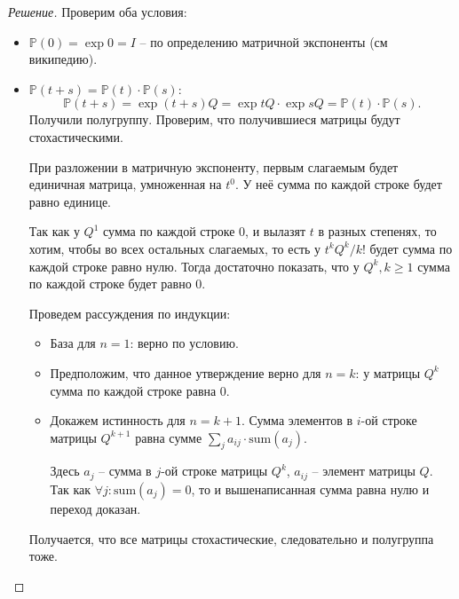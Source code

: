 \documentclass[12pt,a4paper]{extarticle}
\begin{document}
	\begin{proof}[Решение]
		Проверим оба условия:
		\begin{itemize}
			\item $\mathbb{P}(0) = \exp{0} = I$ -- по определению матричной экспоненты (см википедию).
			
			\item $\mathbb{P}(t + s) = \mathbb{P}(t) \cdot \mathbb{P}(s)$:
			\[
				\mathbb{P}(t+s) = \exp{(t+s)Q} = \exp{tQ} \cdot \exp{sQ} = \mathbb{P}(t) \cdot\mathbb{P}(s).
			\]
			Получили полугруппу. Проверим, что получившиеся матрицы будут стохастическими. 
			
			При разложении в матричную экспоненту, первым слагаемым будет единичная матрица, умноженная на $t^0$. У неё сумма по каждой строке будет равно единице. 
			
			Так как у $Q^1$ сумма по каждой строке 0, и вылазят $t$ в разных степенях, то хотим, чтобы во всех остальных слагаемых, то есть у $t^kQ^k / k!$ будет сумма по каждой строке равно нулю. Тогда достаточно показать, что у $Q^k, k \geq 1$ сумма по каждой строке будет равно 0. 
			
			Проведем рассуждения по индукции:
			\begin{itemize}
				\item База для $n = 1$: верно по условию.
				
				\item Предположим, что данное утверждение верно для $n = k$: у матрицы $Q^k$ сумма по каждой строке равна 0.
				
				\item Докажем истинность для $n = k + 1$. Сумма элементов в $i$-ой строке матрицы $Q^{k+1}$ равна сумме $\sum_j a_{ij} \cdot \text{sum}(a_j)$. 
				
				Здесь $a_j$ -- сумма в $j$-ой строке матрицы $Q^k$, $a_{ij}$ -- элемент матрицы $Q$. Так как $\forall j : \text{sum}(a_j) = 0$, то и вышенаписанная сумма равна нулю и переход доказан.
			\end{itemize}
		
		Получается, что все матрицы стохастические, следовательно и полугруппа тоже.
			  
		\end{itemize}
	\end{proof}








	\vspace{\baselineskip}
	
\end{document}
